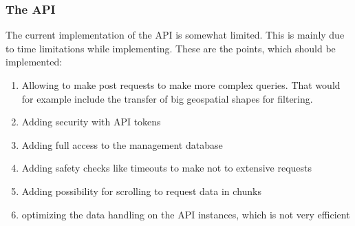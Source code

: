 \subsubsection{The API}\label{the-api}

The current implementation of the API is somewhat limited. This is
mainly due to time limitations while implementing. These are the points,
which should be implemented:

\begin{enumerate}
\def\labelenumi{\arabic{enumi}.}
\tightlist
\item
  Allowing to make post requests to make more complex queries. That
  would for example include the transfer of big geospatial shapes for
  filtering.
\item
  Adding security with API tokens
\item
  Adding full access to the management database
\item
  Adding safety checks like timeouts to make not to extensive requests
\item
  Adding possibility for scrolling to request data in chunks
\item
  optimizing the data handling on the API instances, which is not very
  efficient
\end{enumerate}